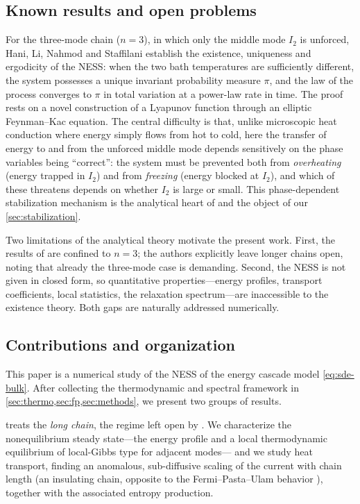 \documentclass[11pt,a4paper]{article}
\theoremstyle{definition}
\numberwithin{equation}{section}   %
\begin{document}
\subsection{Known results and open problems}\label{sec:known}

For the three-mode chain ($n=3$), in which only the middle mode $I_2$ is
unforced, Hani, Li, Nahmod and Staffilani \cite{HLNS} establish the existence,
uniqueness and ergodicity of the NESS: when the two bath temperatures are
sufficiently different, the system possesses a unique invariant probability
measure $\pi$, and the law of the process converges to $\pi$ in total variation
at a power-law rate in time. The proof rests on a novel construction of a
Lyapunov function through an elliptic Feynman--Kac equation. The central
difficulty is that, unlike microscopic heat conduction where energy simply flows
from hot to cold, here the transfer of energy to and from the unforced middle
mode depends sensitively on the phase variables being ``correct'': the system
must be prevented both from \emph{overheating} (energy trapped in $I_2$) and from
\emph{freezing} (energy blocked at $I_2$), and which of these threatens depends on
whether $I_2$ is large or small. This phase-dependent stabilization mechanism is
the analytical heart of \cite{HLNS} and the object of our \cref{sec:stabilization}.

Two limitations of the analytical theory motivate the present work. First, the
results of \cite{HLNS} are confined to $n=3$; the authors explicitly leave longer
chains open, noting that already the three-mode case is demanding. Second, the
NESS is not given in closed form, so quantitative properties---energy profiles,
transport coefficients, local statistics, the relaxation spectrum---are
inaccessible to the existence theory. Both gaps are naturally addressed
numerically.

\subsection{Contributions and organization}\label{sec:contributions}

This paper is a numerical study of the NESS of the energy cascade model
\eqref{eq:sde-bulk}. After collecting the thermodynamic and spectral framework in
\cref{sec:thermo,sec:fp,sec:methods}, we present two groups of results.

 treats the \emph{long chain}, the regime left open by
\cite{HLNS}. We characterize the nonequilibrium steady state---the energy profile
and a local thermodynamic equilibrium of local-Gibbs type for adjacent modes---
and we study heat transport, finding an anomalous, sub-diffusive scaling of the
current with chain length (an insulating chain, opposite to the
Fermi--Pasta--Ulam behavior \cite{LepriLiviPoliti}), together with the
associated entropy production.
\end{document}
